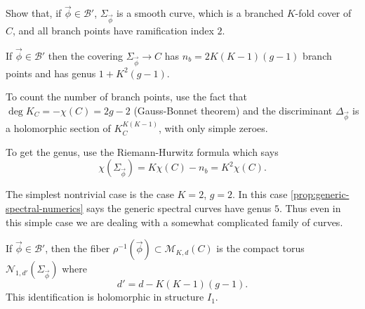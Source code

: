 \documentclass[12pt,letterpaper,reqno]{article}
\numberwithin{equation}{section}
\newcommand{\cB}{\ensuremath{\mathcal B}}
\newcommand{\cM}{\ensuremath{\mathcal M}}
\newcommand{\cN}{\ensuremath{\mathcal N}}
\begin{document}
\begin{exercise} Show that, if $\vec\phi \in \cB'$,
$\Sigma_{\vec\phi}$ is a smooth curve, which is a branched $K$-fold
cover of $C$, and all branch points have ramification index $2$.
\end{exercise}


\begin{prop} \label{prop:generic-spectral-numerics}
If $\vec\phi \in \cB'$ then the covering $\Sigma_{\vec\phi} \to C$ has $n_b = 2K(K-1)(g-1)$ branch points
and has genus $1 + K^2(g-1)$.
\end{prop}
\begin{pf} To count the number of branch points,
use the fact that $\deg K_C = - \chi(C) = 2g-2$
(Gauss-Bonnet theorem)
and the discriminant $\Delta_{\vec\phi}$ is a holomorphic section of
$K_C^{K(K-1)}$, with only simple zeroes.

To get the genus, use the Riemann-Hurwitz formula which says
\begin{equation}
  \chi(\Sigma_{\vec \phi}) = K \chi(C) - n_b = K^2 \chi(C).
\end{equation}
\end{pf}

\begin{example}
The simplest nontrivial case is the case $K=2$, $g=2$. In this case
\autoref{prop:generic-spectral-numerics} says the generic spectral curves have
genus $5$. Thus even in this simple case we are dealing with a somewhat
complicated family of curves.
\end{example}

\begin{prop} \label{prop:hitchin-fibers-are-jacobians}
If $\vec\phi \in \cB'$, then
the fiber $\rho^{-1}(\vec\phi) \subset \cM_{K,d}(C)$
is the compact torus $\cN_{1,d'}(\Sigma_{\vec\phi})$
where
\begin{equation}
	d' = d - K(K-1)(g-1).
\end{equation}
This identification is holomorphic in structure $I_1$.
\end{prop}
\end{document}
